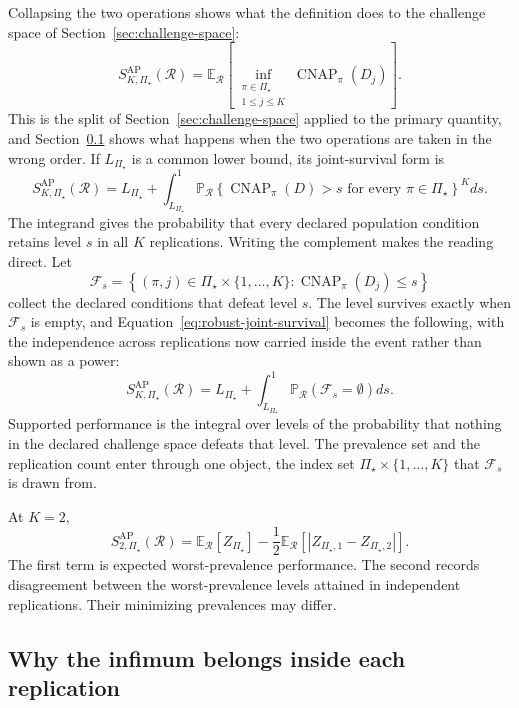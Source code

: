 \documentclass[11pt]{article}
\newcommand{\CNAP}{\operatorname{CNAP}}
\newcommand{\Regime}{\mathcal{R}}
\newcommand{\PSet}{\Pi_\star}
\newcommand{\E}{\mathbb{E}}
\newcommand{\Prb}{\mathbb{P}}
\newcommand{\SRob}{S_{K,\PSet}^{\mathrm{AP}}(\Regime)}
\newcommand{\RefSet}{\mathcal{F}}
\theoremstyle{remark}
\begin{document}
Collapsing the two operations shows what the definition does to the challenge space of Section~\ref{sec:challenge-space}:
\[
\SRob
=
\E_{\Regime}
\left[
\inf_{\substack{\pi\in\PSet\\1\leq j\leq K}}
\CNAP_\pi(D_j)
\right].
\]
This is the split of Section~\ref{sec:challenge-space} applied to the primary quantity, and Section~\ref{sec:infimum-inside} shows what happens when the two operations are taken in the wrong order.
If $L_{\PSet}$ is a common lower bound, its joint-survival form is
\begin{equation}
\SRob
=
L_{\PSet}
+
\int_{L_{\PSet}}^1
\Prb_{\Regime}
\left\{
\CNAP_\pi(D)>s
\text{ for every }\pi\in\PSet
\right\}^{K}
ds.
\label{eq:robust-joint-survival}
\end{equation}
The integrand gives the probability that every declared population condition retains level $s$ in all $K$ replications. Writing the complement makes the reading direct. Let
\begin{equation}
\RefSet_s
=
\left\{
(\pi,j)\in\PSet\times\{1,\ldots,K\}
:
\CNAP_\pi(D_j)\leq s
\right\}
\label{eq:refutation-class}
\end{equation}
collect the declared conditions that defeat level $s$. The level survives exactly when $\RefSet_s$ is empty, and Equation~\eqref{eq:robust-joint-survival} becomes the following, with the independence across replications now carried inside the event rather than shown as a power:
\begin{equation}
\SRob
=
L_{\PSet}
+
\int_{L_{\PSet}}^{1}
\Prb_{\Regime}
\left(
\RefSet_s=\emptyset
\right)
ds .
\label{eq:refutation-integral}
\end{equation}
Supported performance is the integral over levels of the probability that nothing in the declared challenge space defeats that level. The prevalence set and the replication count enter through one object, the index set $\PSet\times\{1,\ldots,K\}$ that $\RefSet_s$ is drawn from.

At $K=2$,
\begin{equation}
S_{2,\PSet}^{\mathrm{AP}}(\Regime)
=
\E_{\Regime}[Z_{\PSet}]
-
\frac12
\E_{\Regime}
\left[
|Z_{\PSet,1}-Z_{\PSet,2}|
\right].
\label{eq:robust-k2}
\end{equation}
The first term is expected worst-prevalence performance. The second records disagreement between the worst-prevalence levels attained in independent replications. Their minimizing prevalences may differ.

\subsection{Why the infimum belongs inside each replication}
\label{sec:infimum-inside}
\end{document}

